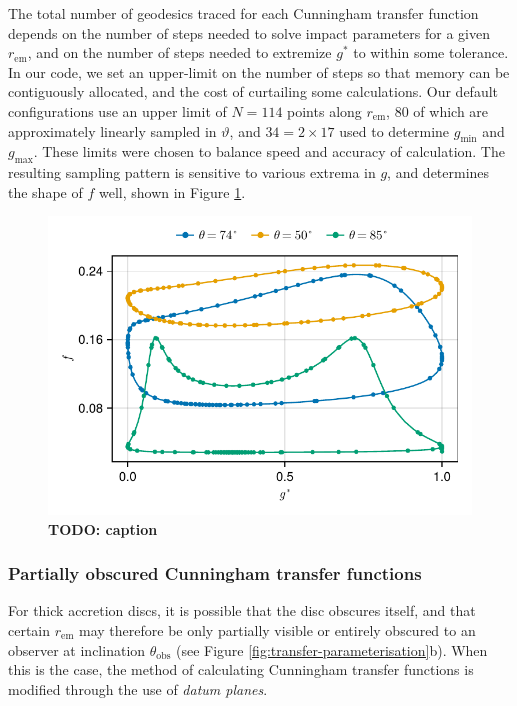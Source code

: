 \documentclass[fleqn,usenatbib]{mnras}
\newcommand{\todo}[1]{{\noindent \bf \color{red} TODO: #1}}
\begin{document}
The total number of geodesics traced for each Cunningham transfer function
depends on the number of steps needed to solve impact parameters for a given
$r_\text{em}$, and on the number of steps needed to extremize $g^\ast$ to within
some tolerance. In our code, we set an upper-limit on the number of steps so
that memory can be contiguously allocated, and the cost of curtailing some
calculations. Our default configurations use an upper limit of $N = 114$ points
along $r_\text{em}$, $80$ of which are approximately linearly sampled in
$\vartheta$, and $34 = 2 \times 17$ used to determine $g_\text{min}$ and
$g_\text{max}$. These limits were chosen to balance speed and accuracy of
calculation. The resulting sampling pattern is sensitive to various extrema in
$g$, and determines the shape of $f$ well, shown in Figure
\ref{fig:transfer-sampling-pattern}.

\begin{figure}
    \centering
    \includegraphics[width=0.95\linewidth]{figures/transfer-functions.sampling.pdf}
    \caption{\todo{caption}}
    \label{fig:transfer-sampling-pattern}
\end{figure}

\subsubsection{Partially obscured Cunningham transfer functions}
\label{sec:partially-obscured-functions}

For thick accretion discs, it is possible that the disc obscures itself, and
that certain $r_\text{em}$ may therefore be only partially visible or entirely
obscured to an observer at inclination $\theta_\text{obs}$ (see Figure
\ref{fig:transfer-parameterisation}b). When this is the case, the method of
calculating Cunningham transfer functions is modified through the use of
\emph{datum planes}.
\end{document}
